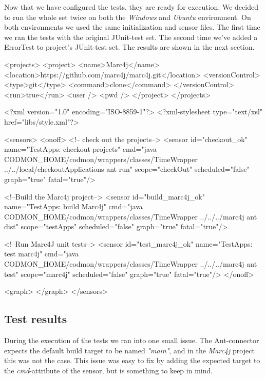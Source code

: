 \documentclass{article}
\begin{document}
\noindent Now that we have configured the tests, they are ready for execution. We decided to run the whole set twice on both the \emph{Windows} and \emph{Ubuntu} environment. On both environments we used 
the same initialization and sensor files. The first time we ran the tests with the original JUnit-test set. The second time we've added a ErrorTest to project's JUnit-test set. The results are shown in 
the next section.\\

\begin{code}[frame=shadowbox, language=XML,showstringspaces=false]
 <projects>
	<project>
		<name>Marc4j</name>
		<location>https://github.com/marc4j/marc4j.git</location>
		<versionControl>
			<type>git</type>
			<command>clone</command>
		</versionControl>
		<run>true</run>
		<user />
		<pwd />
	</project>
</projects>
\end{code} 

\begin{code}[frame=shadowbox, language=XML,showstringspaces=false]
<?xml version="1.0" encoding="ISO-8859-1"?>
<?xml-stylesheet type="text/xsl" href="libs/style.xml"?>

<sensors>
	<onoff>	
		<!-- check out the  projects-->
		<sensor id="checkout_ok" name="TestApps: checkout projects" cmd="java CODMON_HOME/codmon/wrappers/classes/TimeWrapper ../../local/checkoutApplications ant run"  scope="checkOut" scheduled="false" graph="true" fatal="true"/>
	
		<!--Build the Marc4j project-->
		<sensor id="build_marc4j_ok" name="TestApps: build Marc4j" cmd="java CODMON_HOME/codmon/wrappers/classes/TimeWrapper ../../../marc4j ant dist" scope="testApps" scheduled="false" graph="true" fatal="true"/>
	
		<!--Run Marc4J unit tests-->
		<sensor id="test_marc4j_ok" name="TestApps: test  marc4j" cmd="java CODMON_HOME/codmon/wrappers/classes/TimeWrapper ../../../marc4j ant test" scope="marc4j" scheduled="false" graph="true" fatal="true"/>
	</onoff>

	<graph>
	</graph>
</sensors>
\end{code}

\newpage
\subsection{Test results}
\label{test:results}
During the execution of the tests we ran into one small issue. The Ant-connector expects the default build target to be named \emph{"main"}, and in the \emph{Marc4j} project this was not the case. This 
issue was easy to fix by adding the expected target to the \emph{cmd}-attribute of the sensor, but is something to keep in mind.\\
\end{document}
